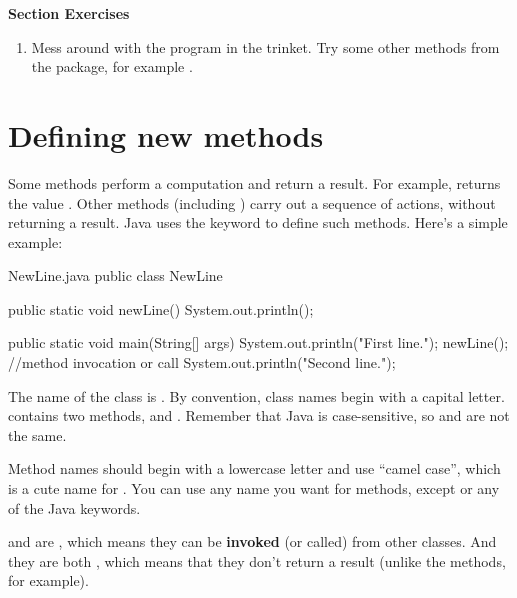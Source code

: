 \textbf{Section Exercises}
\begin{enumerate}
\item Mess around with the program in the trinket.  Try some other methods from the  package, for example .
\end{enumerate}


\section{Defining new methods}
\label{adding_methods}



Some methods perform a computation and return a result.
For example,  returns the value .
Other methods (including ) carry out a sequence of actions, without returning a result.
Java uses the keyword  to define such methods.
Here's a simple example:


\begin{trinket}[240]{NewLine.java}
public class NewLine {

    public static void newLine() {
        System.out.println();
    }

    public static void main(String[] args) {
        System.out.println("First line.");
        newLine(); //method invocation or call
        System.out.println("Second line.");
    }
}
\end{trinket}


The name of the class is .
By convention, class names begin with a capital letter.
 contains two methods,  and .
Remember that Java is case-sensitive, so  and  are not the same.


Method names should begin with a lowercase letter and use ``camel case'', which is a cute name for .
You can use any name you want for methods, except  or any of the Java keywords.


 and  are , which means they can be {\bf invoked} (or called) from other classes.
And they are both , which means that they don't return a result (unlike the  methods, for example).

